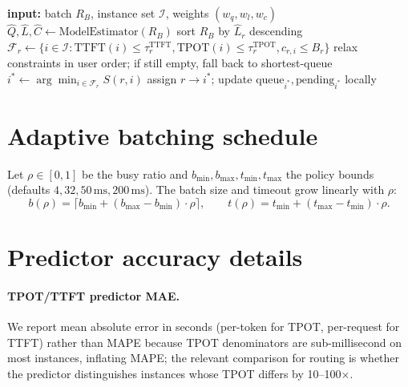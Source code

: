 \documentclass[10pt]{article}
\begin{document}
\begin{algorithm}[t]
\caption{Cara batch scheduler}\label{alg:cara}
\begin{algorithmic}[1]
\State \textbf{input:} batch $R_B$, instance set $\mathcal{I}$, weights $(w_q, w_l, w_c)$
\State $\hat{Q}, \hat{L}, \hat{C} \gets \text{ModelEstimator}(R_B)$ 
\State sort $R_B$ by $\hat{L}_r$ descending 
  \State $\mathcal{F}_r \gets \{i \in \mathcal{I} : \text{TTFT}(i) {\le} \tau^{\text{TTFT}}_r, \text{TPOT}(i){\le}\tau^{\text{TPOT}}_r, c_{r,i}{\le} B_r\}$
   relax constraints in user order; if still empty, fall back to shortest-queue \EndIf
  \State $i^* \gets \arg\min_{i \in \mathcal{F}_r} S(r, i)$ 
  \State assign $r \to i^*$; update $\text{queue}_{i^*}, \text{pending}_{i^*}$ locally
\EndFor
\end{algorithmic}
\end{algorithm}

\section{Adaptive batching schedule}\label{appendix:batching}
Let $\rho \in [0,1]$ be the busy ratio and $b_{\min}, b_{\max}, t_{\min}, t_{\max}$ the policy bounds (defaults $4, 32, 50\,\text{ms}, 200\,\text{ms}$). The batch size and timeout grow linearly with $\rho$:
\[ b(\rho) = \lceil b_{\min} + (b_{\max}-b_{\min}) \cdot \rho \rceil, \qquad t(\rho) = t_{\min} + (t_{\max}-t_{\min}) \cdot \rho. \]

\section{Predictor accuracy details}\label{appendix:predictors}

\paragraph{TPOT/TTFT predictor MAE.}
We report mean absolute error in seconds (per-token for TPOT, per-request for TTFT) rather than MAPE because TPOT denominators are sub-millisecond on most instances, inflating MAPE; the relevant comparison for routing is whether the predictor distinguishes instances whose TPOT differs by 10–100$\times$.
\end{document}
